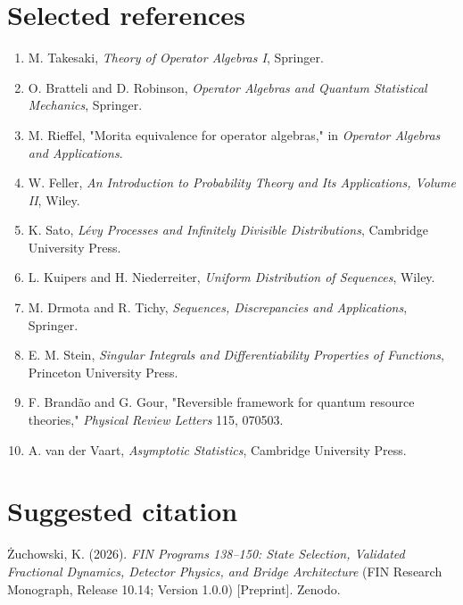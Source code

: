 \documentclass[11pt,a4paper,openany]{report}
\begin{document}
\chapter{Selected references}

\begin{enumerate}
\item 
M. Takesaki, \emph{Theory of Operator Algebras I}, Springer.

\item 
O. Bratteli and D. Robinson, \emph{Operator Algebras and Quantum Statistical Mechanics}, Springer.

\item 
M. Rieffel, "Morita equivalence for operator algebras," in \emph{Operator Algebras and Applications}.

\item 
W. Feller, \emph{An Introduction to Probability Theory and Its Applications, Volume II}, Wiley.

\item 
K. Sato, \emph{Lévy Processes and Infinitely Divisible Distributions}, Cambridge University Press.

\item 
L. Kuipers and H. Niederreiter, \emph{Uniform Distribution of Sequences}, Wiley.

\item 
M. Drmota and R. Tichy, \emph{Sequences, Discrepancies and Applications}, Springer.

\item 
E. M. Stein, \emph{Singular Integrals and Differentiability Properties of Functions}, Princeton University Press.

\item 
F. Brandão and G. Gour, "Reversible framework for quantum resource theories," \emph{Physical Review Letters} 115, 070503.

\item 
A. van der Vaart, \emph{Asymptotic Statistics}, Cambridge University Press.

\end{enumerate}

\chapter{Suggested citation}

\.Zuchowski, K. (2026). \emph{FIN Programs 138--150: State Selection, Validated Fractional Dynamics, Detector Physics, and Bridge Architecture} (FIN Research Monograph, Release 10.14; Version 1.0.0) [Preprint]. Zenodo.
\end{document}
